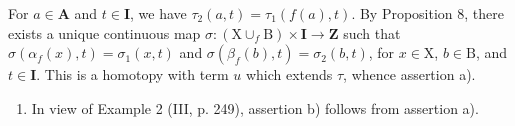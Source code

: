 For \(a \in \mathbf{A}\) and \(t \in \mathbf{I}\), we have \(\tau_2(a, t) = \tau_1(f(a), t)\). By Proposition 8, there exists a unique continuous map \(\sigma: (\mathrm{X} \cup_f \mathrm{B}) \times \mathbf{I} \to \mathbf{Z}\) such that \(\sigma(\alpha_f(x), t) = \sigma_1(x, t)\) and \(\sigma(\beta_f(b), t) = \sigma_2(b, t)\), for \(x \in \mathrm{X}\), \(b \in \mathrm{B}\), and \(t \in \mathbf{I}\). This is a homotopy with term \(u\) which extends \(\tau\), whence assertion a).

\begin{enumerate}
\def\labelenumi{\alph{enumi})}
\setcounter{enumi}{1}
\tightlist
\item
  In view of Example 2 (III, p. 249), assertion b) follows from assertion a).
\end{enumerate}

